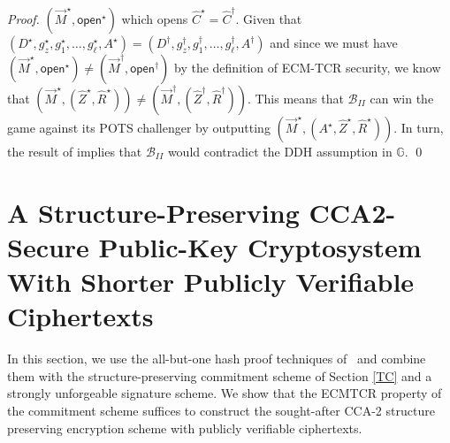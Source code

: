 \documentclass[10pt]{llncs}
\newcommand{\B}{\mathcal{B}}
\newcommand{\G}{\mathbb{G}}
\newcommand{\open}{\mathsf{open}}
\begin{document}
\begin{proof}
$(\vec{M}^\star,\open^\star)$ which   opens $\hat{C}^\star = \hat{C}^\dagger$. Given that   
 $(D^\star, g_z^\star, g_1^\star, \ldots, g_\ell^\star, A^\star )=(D^\dagger, g_z^\dagger, g_1^\dagger, \ldots, g_\ell^\dagger, A^\dagger )$ 
  and since we must have
$(\vec{M}^\star,\open^\star) \neq (\vec{M}^\dagger , \open^\dagger) $ by the definition of ECM-TCR security,  we know that  $(\vec{M}^\star,(\hat{Z}^\star,\hat{R}^\star)) \neq 
(\vec{M}^\dagger,(\hat{Z}^\dagger,\hat{R}^\dagger)) $. This  means that $\B_{II}$ can win the game against its POTS challenger by outputting 
  $(\vec{M}^\star,(A^\star,\hat{Z}^\star,\hat{R}^\star)) $. In turn, the result of \cite{DBLP:conf/asiacrypt/AbeCDKNO12} implies that 
	$\B_{II}$ would contradict the DDH assumption in $\G$. \qed 
\end{proof}


\section{A  Structure-Preserving CCA2-Secure Public-Key  Cryptosystem With Shorter Publicly Verifiable Ciphertexts } \label{SPCCA}
%



In this section, we use the all-but-one hash proof techniques of~\cite{DBLP:conf/tcc/LibertY12} and combine them with the   structure-preserving commitment scheme of Section \ref{TC} and a strongly unforgeable signature scheme. We show that the ECMTCR property of the commitment scheme suffices
to construct the sought-after 
 CCA-2 structure preserving   encryption scheme with publicly verifiable ciphertexts.
\end{document}
